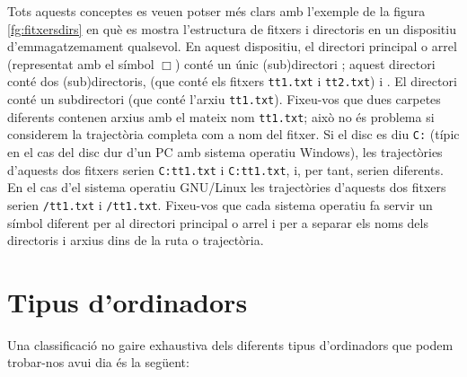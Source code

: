Tots aquests conceptes es veuen potser més clars amb l'exemple de la
figura \ref{fg:fitxersdirs} en què es mostra l'estructura de fitxers i
directoris en un dispositiu d'emmagatzemament qualsevol. En aquest
dispositiu, el directori principal o arrel (representat amb el símbol
$\Box$) conté un únic (sub)directori ; aquest directori
conté dos (sub)directoris,  (que conté els fitxers
\texttt{tt1.txt} i \texttt{tt2.txt}) i .  El directori
 conté un subdirectori  (que conté l'arxiu
\texttt{tt1.txt}). Fixeu-vos que dues carpetes diferents contenen
arxius amb el mateix nom \texttt{tt1.txt}; això no és problema si
considerem la trajectòria completa com a nom del fitxer. Si el disc es
diu \texttt{C:} (típic en el cas del disc dur d'un PC amb sistema
operatiu Windows), les trajectòries d'aquests dos fitxers serien
\texttt{C:}\barra{}\barra{}\barra\texttt{tt1.txt} i
\texttt{C:}\barra{}\barra{}\barra{}\barra\texttt{tt1.txt},
i, per tant, serien diferents. En el cas d'el sistema operatiu
GNU/Linux les trajectòries d'aquests dos fitxers serien
\texttt{/}\texttt{tt1.txt} i
\texttt{/}\texttt{tt1.txt}. Fixeu-vos
que cada sistema operatiu fa servir un símbol diferent per al
directori principal o arrel i per a separar els noms dels directoris i
arxius dins de la ruta o trajectòria.

\section{Tipus d'ordinadors}
Una classificació no gaire exhaustiva dels diferents tipus
d'ordinadors que podem trobar-nos avui dia és la següent:

